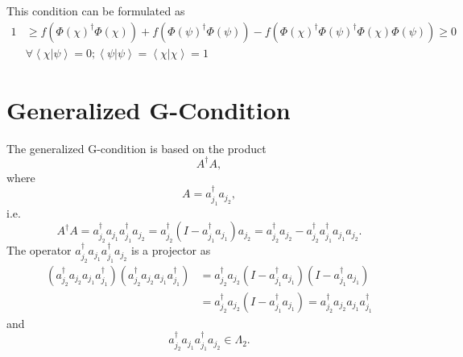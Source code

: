 \documentclass[aps,preprint]{revtex4}%
\begin{document}
This condition can be formulated as
\begin{align}
1  &  \geq f\left(  \Phi\left(  \chi\right)  ^{\dagger}\Phi\left(
\chi\right)  \right)  +f\left(  \Phi\left(  \psi\right)  ^{\dagger}\Phi\left(
\psi\right)  \right)  -f\left(  \Phi\left(  \chi\right)  ^{\dagger}\Phi\left(
\psi\right)  ^{\dagger}\Phi\left(  \chi\right)  \Phi\left(  \psi\right)
\right)  \geq0\nonumber\\
&  \left.  \forall\right.  \left\langle \chi\left\vert \psi\right.
\right\rangle =0;\left\langle \psi\left\vert \psi\right.  \right\rangle
=\left\langle \chi\left\vert \chi\right.  \right\rangle =1
\end{align}


\section{Generalized G-Condition}

The generalized G-condition is based on the product
\begin{equation}
A^{\dagger}A,
\end{equation}
where
\begin{equation}
A=a_{j_{1}}^{\dagger}a_{j_{2}},
\end{equation}
i.e.%
\begin{equation}
A^{\dagger}A=a_{j_{2}}^{\dagger}a_{j_{1}}a_{j_{1}}^{\dagger}a_{j_{2}}%
=a_{j_{2}}^{\dagger}\left(  I-a_{j_{1}}^{\dagger}a_{j_{1}}\right)  a_{j_{2}%
}=a_{j_{2}}^{\dagger}a_{j_{2}}-a_{j_{2}}^{\dagger}a_{j_{1}}^{\dagger}a_{j_{1}%
}a_{j_{2}}.
\end{equation}
The operator $a_{j_{2}}^{\dagger}a_{j_{1}}a_{j_{1}}^{\dagger}a_{j_{2}}$ is a
projector as
\begin{align}
\left(  a_{j_{2}}^{\dagger}a_{j_{2}}a_{j_{1}}a_{j_{1}}^{\dagger}\right)
\left(  a_{j_{2}}^{\dagger}a_{j_{2}}a_{j_{1}}a_{j_{1}}^{\dagger}\right)   &
=a_{j_{2}}^{\dagger}a_{j_{2}}\left(  I-a_{j_{1}}^{\dagger}a_{j_{1}}\right)
\left(  I-a_{j_{1}}^{\dagger}a_{j_{1}}\right) \nonumber\\
&  =a_{j_{2}}^{\dagger}a_{j_{2}}\left(  I-a_{j_{1}}^{\dagger}a_{j_{1}}\right)
=a_{j_{2}}^{\dagger}a_{j_{2}}a_{j_{1}}a_{j_{1}}^{\dagger}%
\end{align}
and
\begin{equation}
a_{j_{2}}^{\dagger}a_{j_{1}}a_{j_{1}}^{\dagger}a_{j_{2}}\in\Lambda_{2}.
\end{equation}
\end{document}
